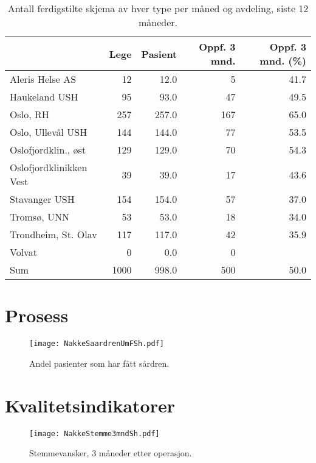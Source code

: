 \documentclass[presentation,xcolor=pdftex,dvipsnames,table]{beamer}\usepackage[]{graphicx}\usepackage[]{color}
\begin{document}
\begin{tiny}
\begin{frame}[fragile]
\begin{table}[ht]
\centering
\begin{tabular}{lrrrr}
  \hline
 & Lege & Pasient & Oppf. 3 mnd. & Oppf. 3 mnd. (\%) \\ 
  \hline
Aleris Helse AS & 12 & 12.0 & 5 & 41.7 \\ 
  Haukeland USH & 95 & 93.0 & 47 & 49.5 \\ 
  Oslo, RH & 257 & 257.0 & 167 & 65.0 \\ 
  Oslo, Ullevål USH & 144 & 144.0 & 77 & 53.5 \\ 
  Oslofjordklin., øst & 129 & 129.0 & 70 & 54.3 \\ 
  Oslofjordklinikken Vest & 39 & 39.0 & 17 & 43.6 \\ 
  Stavanger USH & 154 & 154.0 & 57 & 37.0 \\ 
  Tromsø, UNN & 53 & 53.0 & 18 & 34.0 \\ 
  Trondheim, St. Olav & 117 & 117.0 & 42 & 35.9 \\ 
  Volvat & 0 & 0.0 & 0 &  \\ 
  Sum & 1000 & 998.0 & 500 & 50.0 \\ 
   \hline
\end{tabular}
\caption{Antall ferdigstilte skjema av hver type per måned og avdeling, siste 12 måneder.} 
\end{table}

\end{frame}






\section{Prosess}
\begin{frame}[fragile]
\begin{figure}[ht]
\centering
\texttt{[image: NakkeSaardrenUmFSh.pdf]}
\caption{Andel pasienter som har fått sårdren. }
\end{figure}
\end{frame}

\section{Kvalitetsindikatorer}

\begin{frame}[fragile]
\begin{figure}[ht]
\centering
\texttt{[image: NakkeStemme3mndSh.pdf]}
\caption{Stemmevansker, 3 måneder etter operasjon. }
\end{figure}
\end{frame}


\end{tiny}
\end{document}
